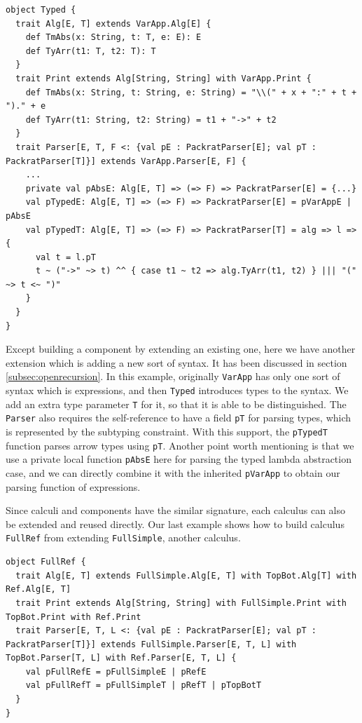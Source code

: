 \begin{lstlisting}
object Typed {
  trait Alg[E, T] extends VarApp.Alg[E] {
    def TmAbs(x: String, t: T, e: E): E
    def TyArr(t1: T, t2: T): T
  }
  trait Print extends Alg[String, String] with VarApp.Print {
    def TmAbs(x: String, t: String, e: String) = "\\(" + x + ":" + t + ")." + e
    def TyArr(t1: String, t2: String) = t1 + "->" + t2
  }
  trait Parser[E, T, F <: {val pE : PackratParser[E]; val pT : PackratParser[T]}] extends VarApp.Parser[E, F] {
    ...
    private val pAbsE: Alg[E, T] => (=> F) => PackratParser[E] = {...}
    val pTypedE: Alg[E, T] => (=> F) => PackratParser[E] = pVarAppE | pAbsE
    val pTypedT: Alg[E, T] => (=> F) => PackratParser[T] = alg => l => {
      val t = l.pT
      t ~ ("->" ~> t) ^^ { case t1 ~ t2 => alg.TyArr(t1, t2) } ||| "(" ~> t <~ ")"
    }
  }
}
\end{lstlisting}

Except building a component by extending an existing one, here we have
another extension which is adding a new sort of syntax. It has been
discussed in section \ref{subsec:openrecursion}. In this example,
originally \lstinline{VarApp} has only one sort of syntax which is
expressions, and then \lstinline{Typed} introduces types to the
syntax. We add an extra type parameter \lstinline{T} for it, so that
it is able to be distinguished. The \lstinline{Parser} also requires
the self-reference to have a field \lstinline{pT} for parsing types,
which is represented by the subtyping constraint. With this support,
the \lstinline{pTypedT} function parses arrow types using
\lstinline{pT}. Another point worth mentioning is that we use a
private local function \lstinline{pAbsE} here for parsing the typed
lambda abstraction case, and we can directly combine it with the
inherited \lstinline{pVarApp} to obtain our parsing function of
expressions.

Since calculi and components have the similar signature, each calculus
can also be extended and reused directly. Our last example shows how
to build calculus \lstinline{FullRef} from extending
\lstinline{FullSimple}, another calculus.

\begin{lstlisting}
object FullRef {
  trait Alg[E, T] extends FullSimple.Alg[E, T] with TopBot.Alg[T] with Ref.Alg[E, T]
  trait Print extends Alg[String, String] with FullSimple.Print with TopBot.Print with Ref.Print
  trait Parser[E, T, L <: {val pE : PackratParser[E]; val pT : PackratParser[T]}] extends FullSimple.Parser[E, T, L] with TopBot.Parser[T, L] with Ref.Parser[E, T, L] {
    val pFullRefE = pFullSimpleE | pRefE
    val pFullRefT = pFullSimpleT | pRefT | pTopBotT
  }
}
\end{lstlisting}

